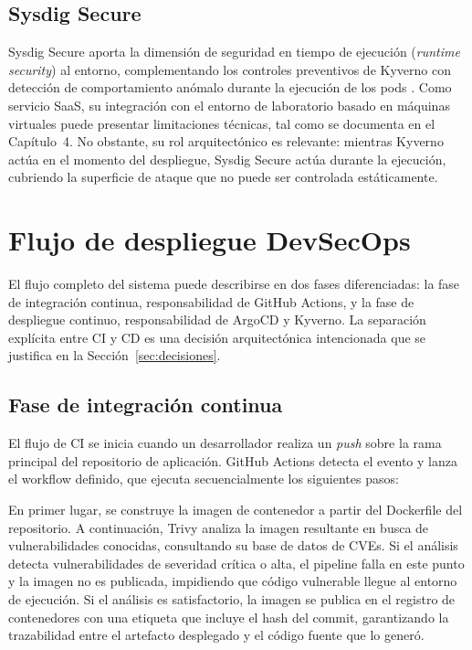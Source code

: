 \subsection{Sysdig Secure}

Sysdig Secure aporta la dimensión de seguridad en tiempo de ejecución (\textit{runtime security}) al entorno, complementando los controles preventivos de Kyverno con detección de comportamiento anómalo durante la ejecución de los pods \cite{sysdig_secure}. Como servicio SaaS, su integración con el entorno de laboratorio basado en máquinas virtuales puede presentar limitaciones técnicas, tal como se documenta en el Capítulo~4. No obstante, su rol arquitectónico es relevante: mientras Kyverno actúa en el momento del despliegue, Sysdig Secure actúa durante la ejecución, cubriendo la superficie de ataque que no puede ser controlada estáticamente.

\section{Flujo de despliegue DevSecOps}

El flujo completo del sistema puede describirse en dos fases diferenciadas: la fase de integración continua, responsabilidad de GitHub Actions, y la fase de despliegue continuo, responsabilidad de ArgoCD y Kyverno. La separación explícita entre CI y CD es una decisión arquitectónica intencionada que se justifica en la Sección~\ref{sec:decisiones}.

\subsection{Fase de integración continua}

El flujo de CI se inicia cuando un desarrollador realiza un \textit{push} sobre la rama principal del repositorio de aplicación. GitHub Actions detecta el evento y lanza el workflow definido, que ejecuta secuencialmente los siguientes pasos:

En primer lugar, se construye la imagen de contenedor a partir del Dockerfile del repositorio. A continuación, Trivy analiza la imagen resultante en busca de vulnerabilidades conocidas, consultando su base de datos de CVEs. Si el análisis detecta vulnerabilidades de severidad crítica o alta, el pipeline falla en este punto y la imagen no es publicada, impidiendo que código vulnerable llegue al entorno de ejecución. Si el análisis es satisfactorio, la imagen se publica en el registro de contenedores con una etiqueta que incluye el hash del commit, garantizando la trazabilidad entre el artefacto desplegado y el código fuente que lo generó.

